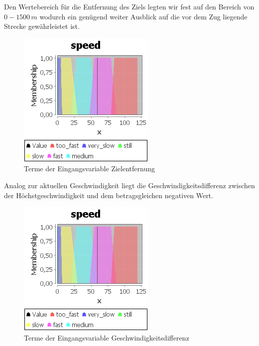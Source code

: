 \documentclass[10pt,a4paper]{article}
\begin{document}
Den Wertebereich für die Entfernung des Ziels legten wir fest auf den Bereich von $ 0 - 1500 \, m $ wodurch ein genügend weiter Ausblick auf die vor dem Zug liegende Strecke gewährleistet ist.

\begin{figure}[htb]
\begin{center}
\includegraphics[width=.5\textwidth]{var_target_distance.png}
\caption[Eingangsvariable Zielentfernung]{Terme der Eingangsvariable Zielentfernung}
\label{var_target_distance}
\end{center}
\end{figure}

Analog zur aktuellen Geschwindigkeit liegt die Geschwindigkeitsdifferenz zwischen der Höchstgeschwindigkeit und dem betragsgleichen negativen Wert.

\begin{figure}[htb]
\begin{center}
\includegraphics[width=.5\textwidth]{var_target_speed.png}
\caption[Eingangsvariable Geschwindigkeitsdifferenz]{Terme der Eingangsvariable Geschwindigkeitsdifferenz}
\label{var_target_speed}
\end{center}
\end{figure}
\end{document}
